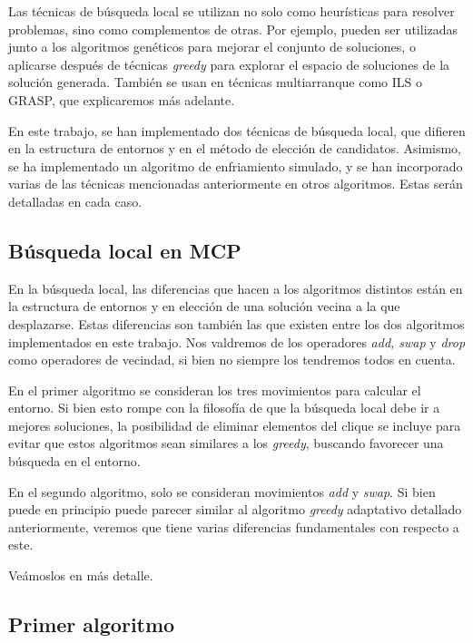 Las técnicas de búsqueda local se utilizan no solo como heurísticas para resolver
problemas, sino como complementos de otras. Por ejemplo, pueden ser utilizadas junto
a los algoritmos genéticos para mejorar el conjunto de soluciones, o aplicarse después
de técnicas \textit{greedy} para explorar el espacio de soluciones de la solución
generada. También se usan en técnicas multiarranque como ILS o GRASP, que explicaremos
más adelante.

En este trabajo, se han implementado dos técnicas de búsqueda local, que difieren en la
estructura de entornos y en el método de elección de candidatos. Asimismo, se ha implementado
un algoritmo de enfriamiento simulado, y se han incorporado varias de las técnicas mencionadas
anteriormente en otros algoritmos. Estas serán detalladas en cada caso.

\subsection{Búsqueda local en MCP}

En la búsqueda local, las diferencias que hacen a los algoritmos distintos están en la estructura
de entornos y en elección de una solución vecina a la que desplazarse. Estas diferencias son
también las que existen entre los dos algoritmos implementados en este trabajo. Nos valdremos
de los operadores \textit{add, swap} y \textit{drop} como operadores de vecindad, si bien no
siempre los tendremos todos en cuenta.

En el primer algoritmo se consideran los tres movimientos para calcular el entorno.
Si bien esto rompe con la filosofía de que la búsqueda local debe ir a mejores soluciones,
la posibilidad de eliminar elementos del clique se incluye para evitar que estos algoritmos
sean similares a los \textit{greedy}, buscando favorecer una búsqueda en el entorno.

En el segundo algoritmo, solo se consideran movimientos \textit{add} y \textit{swap}.
Si bien puede en principio puede parecer similar al algoritmo \textit{greedy} adaptativo
detallado anteriormente, veremos que tiene varias diferencias fundamentales con respecto
a este.

Veámoslos en más detalle.

\subsection{Primer algoritmo}

